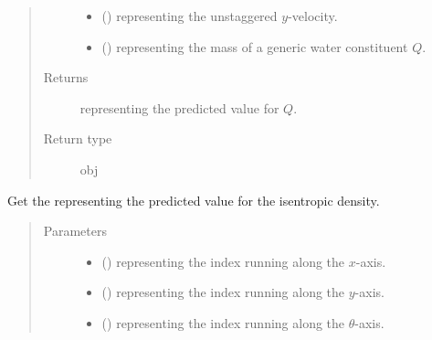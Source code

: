 \documentclass[letterpaper,10pt,english]{sphinxmanual}
\begin{document}
\begin{fulllineitems}
\begin{fulllineitems}
\begin{quote}
\begin{description}
\begin{itemize}
\item {} 
 () \textendash{}  representing the unstaggered \(y\)-velocity.

\item {} 
 () \textendash{}  representing the mass of a generic water constituent \(Q\).

\end{itemize}

\item[{Returns}] \leavevmode
{} representing the predicted value for \(Q\).

\item[{Return type}] \leavevmode
obj

\end{description}\end{quote}

\end{fulllineitems}


\begin{fulllineitems}
\label{\detokenize{api:dycore.flux_isentropic.FluxIsentropicMacCormack._get_maccormack_predicted_value_density}}
Get the  representing the predicted value for the isentropic density.
\begin{quote}\begin{description}
\item[{Parameters}] \leavevmode\begin{itemize}
\item {} 
 () \textendash{}  representing the index running along the \(x\)-axis.

\item {} 
 () \textendash{}  representing the index running along the \(y\)-axis.

\item {} 
 () \textendash{}  representing the index running along the \(\theta\)-axis.


\end{itemize}
\end{description}
\end{quote}
\end{fulllineitems}
\end{fulllineitems}
\end{document}
